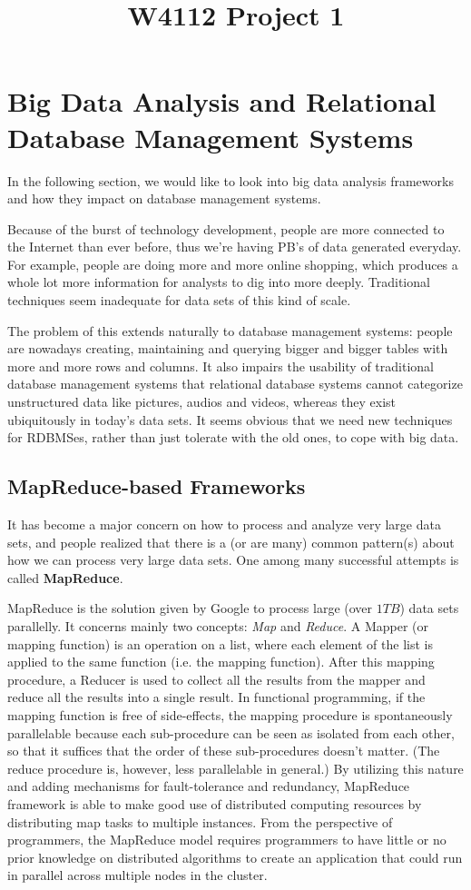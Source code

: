 \documentclass{article}
\title{W4112 Project 1}
\begin{document}
\section{Big Data Analysis and Relational Database Management Systems}

In the following section, we would like to look into big data analysis frameworks and how they impact on database management systems.

Because of the burst of technology development, people are more connected to the Internet than ever before, thus we're having PB's of data generated everyday. For example, people are doing more and more online shopping, which produces a whole lot more information for analysts to dig into more deeply. Traditional techniques seem inadequate for data sets of this kind of scale. 

The problem of this extends naturally to database management systems: people are nowadays creating, maintaining and querying bigger and bigger tables with more and more rows and columns. It also impairs the usability of traditional database management systems that relational database systems cannot categorize unstructured data like pictures, audios and videos, whereas they exist ubiquitously in today's data sets.\cite{bigs1} It seems obvious that we need new techniques for RDBMSes, rather than just tolerate with the old ones, to cope with big data.

\subsection{MapReduce-based Frameworks}

It has become a major concern on how to process and analyze very large data sets, and people realized that there is a (or are many) common pattern(s) about how we can process very large data sets. One among many successful attempts is called \textbf{MapReduce}.

MapReduce is the solution given by Google to process large (over $1TB$) data sets parallelly. It concerns mainly two concepts: \textit{Map} and \textit{Reduce}. A Mapper (or mapping function) is an operation on a list, where each element of the list is applied to the same function (i.e. the mapping function). After this mapping procedure, a Reducer is used to collect all the results from the mapper and reduce all the results into a single result. In functional programming, if the mapping function is free of side-effects, the mapping procedure is spontaneously parallelable because each sub-procedure can be seen as isolated from each other, so that it suffices that the order of these sub-procedures doesn't matter. (The reduce procedure is, however, less parallelable in general.) By utilizing this nature and adding mechanisms for fault-tolerance and redundancy, MapReduce framework is able to make good use of distributed computing resources by distributing map tasks to multiple instances.\cite{wiki:mapreduce} From the perspective of programmers, the MapReduce model requires programmers to have little or no prior knowledge on distributed algorithms to create an application that could run in parallel across multiple nodes in the cluster.\cite{xie2010improving}
\end{document}
